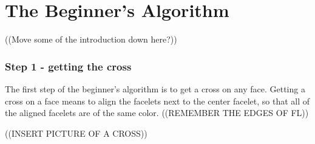 \chapter{The Beginner's Algorithm}


((Move some of the introduction down here?))

\subsection{Step 1 - getting the cross}
The first step of the beginner's algorithm is to get a cross on any face. Getting a cross on a face means to align the facelets next to the center facelet, so that all of the aligned facelets are of the same color. ((REMEMBER THE EDGES OF FL))

((INSERT PICTURE OF A CROSS))


